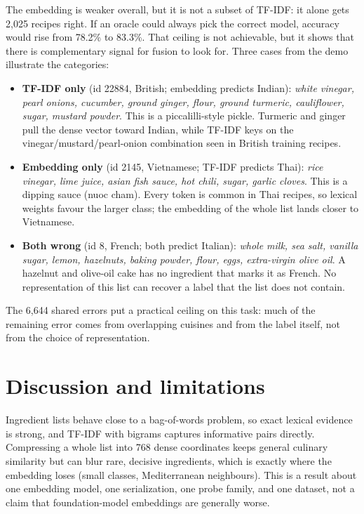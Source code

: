 \documentclass[11pt,letterpaper]{article}
\newcommand{\tfidf}{TF-IDF}
\begin{document}
The embedding is weaker overall, but it is not a subset of \tfidf{}: it alone gets 2,025 recipes right. If an oracle could always pick the correct model, accuracy would rise from 78.2\% to 83.3\%. That ceiling is not achievable, but it shows that there is complementary signal for fusion to look for. Three cases from the demo illustrate the categories:

\begin{itemize}
  \item \textbf{\tfidf{} only} (id 22884, British; embedding predicts Indian): \emph{white vinegar, pearl onions, cucumber, ground ginger, flour, ground turmeric, cauliflower, sugar, mustard powder}. This is a piccalilli-style pickle. Turmeric and ginger pull the dense vector toward Indian, while \tfidf{} keys on the vinegar/mustard/pearl-onion combination seen in British training recipes.
  \item \textbf{Embedding only} (id 2145, Vietnamese; \tfidf{} predicts Thai): \emph{rice vinegar, lime juice, asian fish sauce, hot chili, sugar, garlic cloves}. This is a dipping sauce (nuoc cham). Every token is common in Thai recipes, so lexical weights favour the larger class; the embedding of the whole list lands closer to Vietnamese.
  \item \textbf{Both wrong} (id 8, French; both predict Italian): \emph{whole milk, sea salt, vanilla sugar, lemon, hazelnuts, baking powder, flour, eggs, extra-virgin olive oil}. A hazelnut and olive-oil cake has no ingredient that marks it as French. No representation of this list can recover a label that the list does not contain.
\end{itemize}

The 6,644 shared errors put a practical ceiling on this task: much of the remaining error comes from overlapping cuisines and from the label itself, not from the choice of representation.

\section{Discussion and limitations}
Ingredient lists behave close to a bag-of-words problem, so exact lexical evidence is strong, and \tfidf{} with bigrams captures informative pairs directly. Compressing a whole list into 768 dense coordinates keeps general culinary similarity but can blur rare, decisive ingredients, which is exactly where the embedding loses (small classes, Mediterranean neighbours). This is a result about one embedding model, one serialization, one probe family, and one dataset, not a claim that foundation-model embeddings are generally worse.
\end{document}
